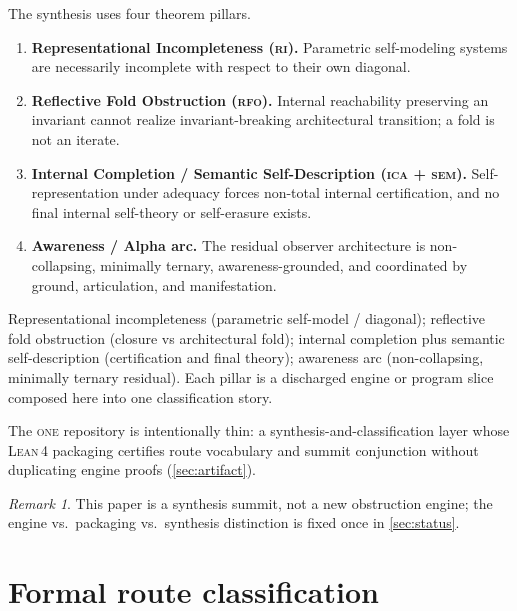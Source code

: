 \documentclass[11pt]{article}
\theoremstyle{plain}
\theoremstyle{definition}
\theoremstyle{remark}
\newtheorem{remark}[theorem]{Remark}
\newcommand{\ONE}{\textsc{one}}
\newcommand{\RI}{\textsc{ri}}
\newcommand{\RFO}{\textsc{rfo}}
\newcommand{\ICA}{\textsc{ica}}
\newcommand{\SEM}{\textsc{sem}}
\newcommand{\Lean}{\textsc{Lean\,4}}
\begin{document}
The synthesis uses four theorem pillars.
\begin{enumerate}[label=(\arabic*),leftmargin=2.2em]
\item \textbf{Representational Incompleteness (\RI).}
      Parametric self-modeling systems are necessarily incomplete with
      respect to their own diagonal.
\item \textbf{Reflective Fold Obstruction (\RFO).}
      Internal reachability preserving an invariant cannot realize
      invariant-breaking architectural transition; a fold is not an
      iterate.
\item \textbf{Internal Completion / Semantic Self-Description
      (\ICA{} + \SEM).}
      Self-representation under adequacy forces non-total internal
      certification, and no final internal self-theory or self-erasure
      exists.
\item \textbf{Awareness / Alpha arc.}
      The residual observer architecture is non-collapsing, minimally
      ternary, awareness-grounded, and coordinated by ground,
      articulation, and manifestation.
\end{enumerate}

\begin{keybox}[title={Four pillars of the synthesis}]
Representational incompleteness (parametric self-model / diagonal);
reflective fold obstruction (closure vs architectural fold); internal
completion plus semantic self-description (certification and final
theory); awareness arc (non-collapsing, minimally ternary residual).
Each pillar is a discharged engine or program slice composed here into
one classification story.
\end{keybox}

The \ONE{} repository is intentionally thin: a synthesis-and-classification
layer whose \Lean{} packaging certifies route vocabulary and summit
conjunction without duplicating engine proofs (\cref{sec:artifact}).

\begin{remark}
This paper is a synthesis summit, not a new obstruction engine; the
engine vs.\ packaging vs.\ synthesis distinction is fixed once in
\cref{sec:status}.
\end{remark}

\section{Formal route classification}
\label{sec:routes}
\end{document}
